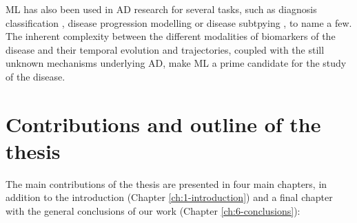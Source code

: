 ML has also been used in AD research for several tasks, such as diagnosis classification \cite{Rathore2017}, disease progression modelling \cite{Oxtoby2017,Lei2020,Fisher2019} or disease subtpying \cite{Young2017}, to name a few. The inherent complexity between the different modalities of biomarkers of the disease and their temporal evolution and trajectories, coupled with the still unknown mechanisms underlying AD, make ML a prime candidate for the study of the disease. \\

\section{Contributions and outline of the thesis}

The main contributions of the thesis are presented in four main chapters, in addition to the introduction (Chapter \ref{ch:1-introduction}) and a final chapter with the general conclusions of our work (Chapter \ref{ch:6-conclusions}):

